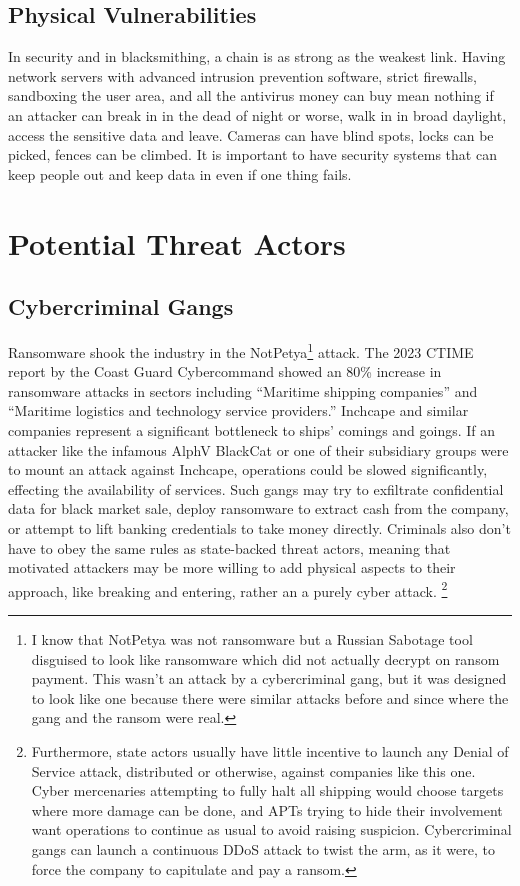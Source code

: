 \documentclass[12pt]{article}
\let\footcite\footfullcite
\begin{document}
\subsection{Physical Vulnerabilities}
In security and in blacksmithing, a chain is as strong as the weakest link. Having network servers with advanced intrusion prevention software, strict firewalls, sandboxing the user area, and all the antivirus money can buy mean nothing if an attacker can break in in the dead of night or worse, walk in in broad daylight, access the sensitive data and leave. Cameras can have blind spots, locks can be picked, fences can be climbed. It is important to have security systems that can keep people out and keep data in even if one thing fails.
\section{Potential Threat Actors} \label{actors}
\subsection{Cybercriminal Gangs}
Ransomware shook the industry in the NotPetya\footnote{I know that NotPetya was not ransomware but a Russian Sabotage tool disguised to look like ransomware which did not actually decrypt on ransom payment. This wasn't an attack by a cybercriminal gang, but it was designed to look like one because there were similar attacks before and since where the gang and the ransom were real.} attack. The 2023 CTIME report by the Coast Guard Cybercommand showed an 80\% increase in ransomware attacks in sectors including ``Maritime shipping companies'' and ``Maritime logistics and technology service providers.''\footcite{coast_guard_cyber_command_2023_2024}
Inchcape and similar companies represent a significant bottleneck to ships' comings and goings. If an attacker like the infamous AlphV BlackCat or one of their subsidiary groups were to mount an attack against Inchcape, operations could be slowed significantly, effecting the availability of services. Such gangs may try to exfiltrate confidential data for black market sale, deploy ransomware to extract cash from the company, or attempt to lift banking credentials to take money directly. Criminals also don't have to obey the same rules as state-backed threat actors, meaning that motivated attackers may be more willing to add physical aspects to their approach, like breaking and entering, rather an a purely cyber attack. \footnote{Furthermore, state actors usually have little incentive to launch any Denial of Service attack, distributed or otherwise, against companies like this one. Cyber mercenaries attempting to fully halt all shipping would choose targets where more damage can be done, and APTs trying to hide their involvement want operations to continue as usual to avoid raising suspicion. Cybercriminal gangs can launch a continuous DDoS attack to twist the arm, as it were, to force the company to capitulate and pay a ransom.}
\end{document}

